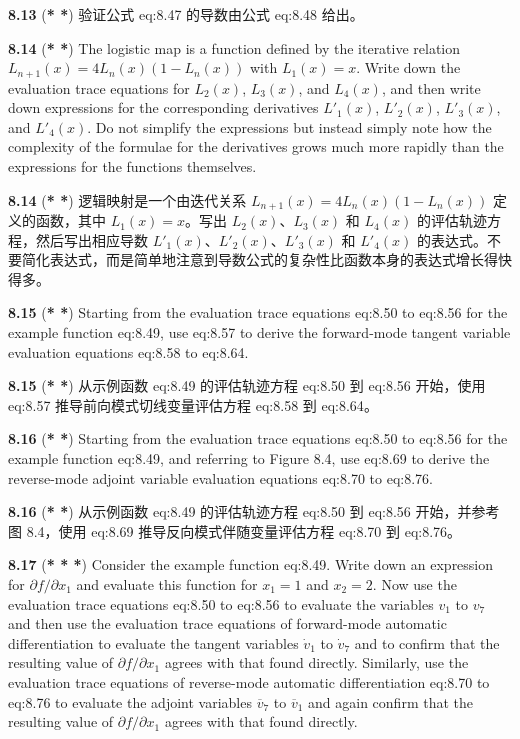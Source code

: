 \documentclass{article}
\begin{document}
\textbf{8.13} (\textbf{* *}) 验证公式 {eq:8.47} 的导数由公式 {eq:8.48} 给出。

\textbf{8.14} (\textbf{* *}) The logistic map is a function defined by the iterative relation $L_{n+1}(x) = 4L_n(x)(1 - L_n(x))$ with $L_1(x) = x$. Write down the evaluation trace equations for $L_2(x)$, $L_3(x)$, and $L_4(x)$, and then write down expressions for the corresponding derivatives $L'_1(x)$, $L'_2(x)$, $L'_3(x)$, and $L'_4(x)$. Do not simplify the expressions but instead simply note how the complexity of the formulae for the derivatives grows much more rapidly than the expressions for the functions themselves.

\textbf{8.14} (\textbf{* *}) 逻辑映射是一个由迭代关系 $L_{n+1}(x) = 4L_n(x)(1 - L_n(x))$ 定义的函数，其中 $L_1(x) = x$。写出 $L_2(x)$、$L_3(x)$ 和 $L_4(x)$ 的评估轨迹方程，然后写出相应导数 $L'_1(x)$、$L'_2(x)$、$L'_3(x)$ 和 $L'_4(x)$ 的表达式。不要简化表达式，而是简单地注意到导数公式的复杂性比函数本身的表达式增长得快得多。

\textbf{8.15} (\textbf{* *}) Starting from the evaluation trace equations {eq:8.50} to {eq:8.56} for the example function {eq:8.49}, use {eq:8.57} to derive the forward-mode tangent variable evaluation equations {eq:8.58} to {eq:8.64}.

\textbf{8.15} (\textbf{* *}) 从示例函数 {eq:8.49} 的评估轨迹方程 {eq:8.50} 到 {eq:8.56} 开始，使用 {eq:8.57} 推导前向模式切线变量评估方程 {eq:8.58} 到 {eq:8.64}。

\textbf{8.16} (\textbf{* *}) Starting from the evaluation trace equations {eq:8.50} to {eq:8.56} for the example function {eq:8.49}, and referring to Figure 8.4, use {eq:8.69} to derive the reverse-mode adjoint variable evaluation equations {eq:8.70} to {eq:8.76}.

\textbf{8.16} (\textbf{* *}) 从示例函数 {eq:8.49} 的评估轨迹方程 {eq:8.50} 到 {eq:8.56} 开始，并参考图 8.4，使用 {eq:8.69} 推导反向模式伴随变量评估方程 {eq:8.70} 到 {eq:8.76}。

\textbf{8.17} (\textbf{* * *}) Consider the example function {eq:8.49}. Write down an expression for $\partial f / \partial x_1$ and evaluate this function for $x_1 = 1$ and $x_2 = 2$. Now use the evaluation trace equations {eq:8.50} to {eq:8.56} to evaluate the variables $v_1$ to $v_7$ and then use the evaluation trace equations of forward-mode automatic differentiation to evaluate the tangent variables $\dot{v}_1$ to $\dot{v}_7$ and to confirm that the resulting value of $\partial f / \partial x_1$ agrees with that found directly. Similarly, use the evaluation trace equations of reverse-mode automatic differentiation {eq:8.70} to {eq:8.76} to evaluate the adjoint variables $\overline{v}_7$ to $\overline{v}_1$ and again confirm that the resulting value of $\partial f / \partial x_1$ agrees with that found directly.
\end{document}
